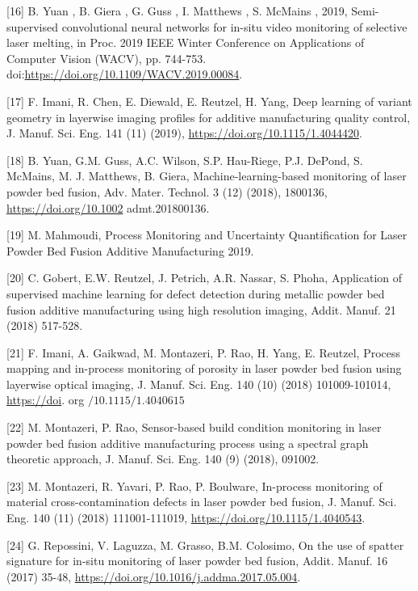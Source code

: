 \documentclass[10pt]{article}
\begin{document}
[16] B. Yuan , B. Giera , G. Guss , I. Matthews , S. McMains , 2019, Semi-supervised convolutional neural networks for in-situ video monitoring of selective laser melting, in Proc. 2019 IEEE Winter Conference on Applications of Computer Vision (WACV), pp. 744-753. doi:\href{https://doi.org/10.1109/WACV.2019.00084}{https://doi.org/10.1109/WACV.2019.00084}.

[17] F. Imani, R. Chen, E. Diewald, E. Reutzel, H. Yang, Deep learning of variant geometry in layerwise imaging profiles for additive manufacturing quality control, J. Manuf. Sci. Eng. 141 (11) (2019), \href{https://doi.org/10.1115/1.4044420}{https://doi.org/10.1115/1.4044420}.

[18] B. Yuan, G.M. Guss, A.C. Wilson, S.P. Hau-Riege, P.J. DePond, S. McMains, M. J. Matthews, B. Giera, Machine-learning-based monitoring of laser powder bed fusion, Adv. Mater. Technol. 3 (12) (2018), 1800136, \href{https://doi.org/10.1002}{https://doi.org/10.1002} admt.201800136.

[19] M. Mahmoudi, Process Monitoring and Uncertainty Quantification for Laser Powder Bed Fusion Additive Manufacturing 2019.

[20] C. Gobert, E.W. Reutzel, J. Petrich, A.R. Nassar, S. Phoha, Application of supervised machine learning for defect detection during metallic powder bed fusion additive manufacturing using high resolution imaging, Addit. Manuf. 21 (2018) 517-528.

[21] F. Imani, A. Gaikwad, M. Montazeri, P. Rao, H. Yang, E. Reutzel, Process mapping and in-process monitoring of porosity in laser powder bed fusion using layerwise optical imaging, J. Manuf. Sci. Eng. 140 (10) (2018) 101009-101014, \href{https://doi}{https://doi}. org $/ 10.1115 / 1.4040615$

[22] M. Montazeri, P. Rao, Sensor-based build condition monitoring in laser powder bed fusion additive manufacturing process using a spectral graph theoretic approach, J. Manuf. Sci. Eng. 140 (9) (2018), 091002.

[23] M. Montazeri, R. Yavari, P. Rao, P. Boulware, In-process monitoring of material cross-contamination defects in laser powder bed fusion, J. Manuf. Sci. Eng. 140 (11) (2018) 111001-111019, \href{https://doi.org/10.1115/1.4040543}{https://doi.org/10.1115/1.4040543}.

[24] G. Repossini, V. Laguzza, M. Grasso, B.M. Colosimo, On the use of spatter signature for in-situ monitoring of laser powder bed fusion, Addit. Manuf. 16 (2017) 35-48, \href{https://doi.org/10.1016/j.addma.2017.05.004}{https://doi.org/10.1016/j.addma.2017.05.004}.
\end{document}

